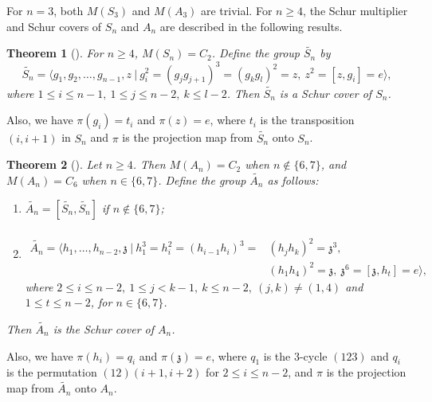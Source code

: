 \documentclass[12pt,a4paper]{article}
\newtheorem{theorem}{Theorem}[section]
\begin{document}
For $n=3$, both $M(S_3)$ and $M(A_3)$ are trivial. For $n\geq 4$, the Schur multiplier and Schur covers of $S_n$ and $A_n$ are described in the following results. 
\begin{theorem}[{\rm\cite[Theorem 2.12.3]{karpi}}]\label{symmetric_schur_cover}
 For $n\geq 4$, $M(S_n)=C_2$. Define the group $\tilde{S_n}$ by 
 \[\tilde{S_n}=\langle g_1,g_2,\dots,g_{n-1},z~\vert~ g_i^2=(g_jg_{j+1})^3=(g_kg_l)^2=z,~z^2=[z,g_i]=e\rangle,\]
 where $1\leq i\leq n-1,~1\leq j\leq n-2,~k\leq l-2$. Then $\tilde{S_n}$ is a Schur cover of $S_n$.
\end{theorem}
\noindent Also, we have $\pi(g_i)=t_i$ and $\pi(z)=e$, where $t_i$ is the transposition $(i,i+1)$ in $S_n$ and $\pi$ is the projection map from $\tilde{S_n}$ onto $S_n$.
\begin{theorem}[{\cite[Theorem 2.12.5]{karpi}}]\label{alternating_schur_cover}
Let $n\geq 4$. Then $M(A_n)=C_2$ when $n\notin \{6,7\}$, and $M(A_n)=C_6$ when $n\in \{6,7\}$. Define the group $\tilde{A_n}$ as follows:
\begin{enumerate}[\rm (i)]
    \item $\tilde{A_n}=[\tilde{S_n},\tilde{S_n}]$ if $n\notin \{6,7\}$;
    \item $\begin{aligned}\\
     \tilde{A_n}=\langle h_1,\dots,h_{n-2},\mathfrak{z}~\vert~h_1^3=h_i^2=(h_{i-1}h_i)^3=&(h_jh_k)^2=\mathfrak{z}^3,\\
     &(h_1h_4)^2=\mathfrak{z},~\mathfrak{z}^6=[\mathfrak{z},h_t]=e\rangle, 
    \end{aligned}$\\
    where $2\leq i\leq n-2,~1\leq j<k-1,~k\leq n-2,~(j,k)\neq(1,4)$ and $1\leq t\leq n-2$, for $n\in \{6,7\}$.
\end{enumerate}
Then $\tilde{A_n}$ is the Schur cover of $A_n$.
\end{theorem}
\noindent Also, we have $\pi(h_i)=q_i$ and $\pi(\mathfrak{z})=e$, where $q_1$ is the $3$-cycle $(123)$ and $q_i$ is the permutation $(12)(i+1,i+2)$ for $2\leq i\leq n-2$, and $\pi$ is the projection map from $\tilde{A_n}$ onto $A_n$.
\end{document}
